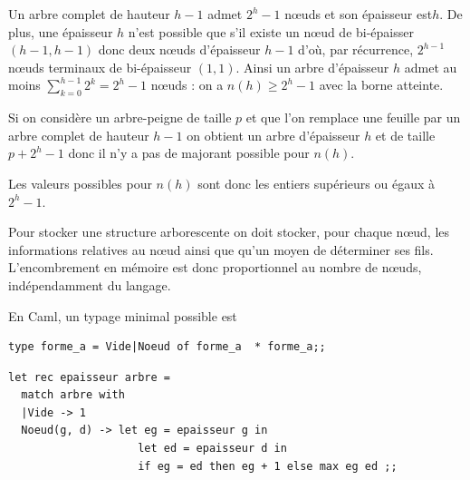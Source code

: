 \begin{Exercise}
	Un arbre complet de hauteur $h-1$ admet $2^{h}-1$ n{\oe}uds  et son épaisseur est$ h$. De plus, une épaisseur $h$ n'est possible que s'il existe un n{\oe}ud de bi-épaisser $(h-1, h-1)$ donc deux  n{\oe}uds d'épaisseur $h-1$ d'où, par récurrence, $2^{h-1}$ n{\oe}uds terminaux de bi-épaisseur $(1,1)$. Ainsi un arbre d'épaisseur $h$ admet au moins $\displaystyle \sum_{k=0}^{h-1}2^k=2^h-1$ n{\oe}uds : on a $n(h) \ge 2^h-1$ avec la borne atteinte.

Si on considère un arbre-peigne de taille $p$ et que l'on remplace une feuille par un arbre complet de hauteur $h-1$ on obtient un arbre d'épaisseur $h$ et de taille $p+ 2^h -1$ donc il n'y a pas de majorant possible pour $n(h)$.

Les valeurs possibles pour $n(h)$ sont donc les entiers supérieurs ou égaux à $2^h - 1$.
\end{Exercise}
\begin{Exercise}
Pour stocker une structure arborescente on doit stocker, pour chaque n{\oe}ud, les informations relatives au n{\oe}ud ainsi que qu'un moyen de déterminer ses fils. L'encombrement en mémoire est donc proportionnel au nombre de n{\oe}uds, indépendamment du langage.

En Caml, un typage minimal possible est
\begin{lstlisting}
type forme_a = Vide|Noeud of forme_a  * forme_a;;
\end{lstlisting}
\end{Exercise}
\begin{Exercise}
\begin{lstlisting}
let rec epaisseur arbre = 
  match arbre with
  |Vide -> 1
  Noeud(g, d) -> let eg = epaisseur g in
                    let ed = epaisseur d in
                    if eg = ed then eg + 1 else max eg ed ;;
\end{lstlisting}
\end{Exercise}
